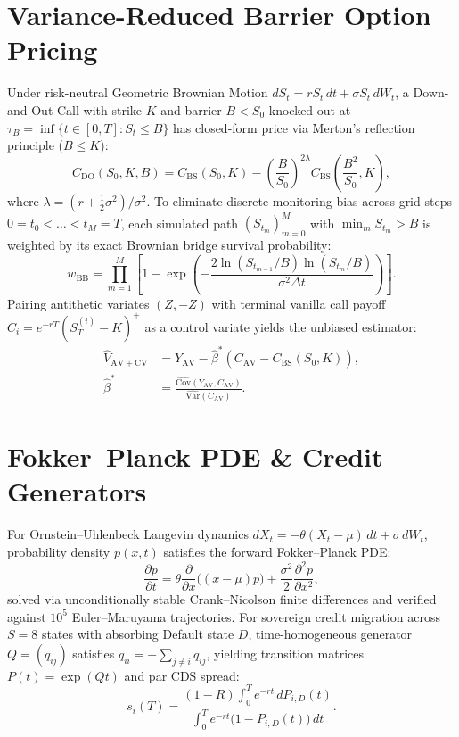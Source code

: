 \documentclass[10pt,twocolumn,a4paper]{article}
\begin{document}
\section{Variance-Reduced Barrier Option Pricing}
Under risk-neutral Geometric Brownian Motion $dS_t = r S_t\,dt + \sigma S_t\,dW_t$, a Down-and-Out Call with strike $K$ and barrier $B < S_0$ knocked out at $\tau_B = \inf\{t \in [0,T] : S_t \le B\}$ has closed-form price via Merton's reflection principle ($B \le K$):
\begin{equation}
C_{\mathrm{DO}}(S_0, K, B) = C_{\mathrm{BS}}(S_0, K) - \left(\frac{B}{S_0}\right)^{2\lambda} C_{\mathrm{BS}}\!\left(\frac{B^2}{S_0}, K\right),
\end{equation}
where $\lambda = (r + \tfrac{1}{2}\sigma^2)/\sigma^2$. To eliminate discrete monitoring bias across grid steps $0 = t_0 < \dots < t_M = T$, each simulated path $(S_{t_m})_{m=0}^M$ with $\min_m S_{t_m} > B$ is weighted by its exact Brownian bridge survival probability:
\begin{equation}
w_{\mathrm{BB}} = \prod_{m=1}^M \left[1 - \exp\!\left(-\frac{2\ln(S_{t_{m-1}}/B)\ln(S_{t_m}/B)}{\sigma^2 \Delta t}\right)\right].
\end{equation}
Pairing antithetic variates $(Z, -Z)$ with terminal vanilla call payoff $C_i = e^{-rT}(S_T^{(i)} - K)^+$ as a control variate yields the unbiased estimator:
\begin{align}
\hat{V}_{\mathrm{AV+CV}} &= \bar{Y}_{\mathrm{AV}} - \hat{\beta}^*\!\left(\bar{C}_{\mathrm{AV}} - C_{\mathrm{BS}}(S_0, K)\right), \nonumber \\
\hat{\beta}^* &= \frac{\widehat{\mathrm{Cov}}(Y_{\mathrm{AV}}, C_{\mathrm{AV}})}{\widehat{\mathrm{Var}}(C_{\mathrm{AV}})}.
\end{align}

\section{Fokker--Planck PDE \& Credit Generators}
For Ornstein--Uhlenbeck Langevin dynamics $dX_t = -\theta(X_t - \mu)\,dt + \sigma\,dW_t$, probability density $p(x,t)$ satisfies the forward Fokker--Planck PDE:
\begin{equation}
\frac{\partial p}{\partial t} = \theta\frac{\partial}{\partial x}\big((x - \mu)p\big) + \frac{\sigma^2}{2}\frac{\partial^2 p}{\partial x^2},
\end{equation}
solved via unconditionally stable Crank--Nicolson finite differences and verified against $10^5$ Euler--Maruyama trajectories. For sovereign credit migration across $S=8$ states with absorbing Default state $D$, time-homogeneous generator $Q = (q_{ij})$ satisfies $q_{ii} = -\sum_{j\neq i} q_{ij}$, yielding transition matrices $P(t) = \exp(Qt)$ and par CDS spread:
\begin{equation}
s_i(T) = \frac{(1 - R)\int_0^T e^{-rt}\,dP_{i,D}(t)}{\int_0^T e^{-rt}\big(1 - P_{i,D}(t)\big)\,dt}.
\end{equation}
\end{document}
